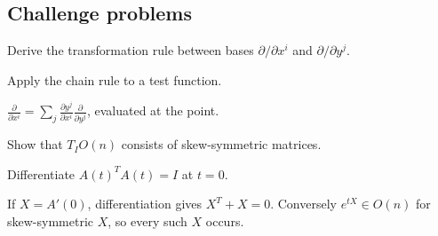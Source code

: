 \subsection*{Challenge problems}

\begin{exercise}\label{exr:vii04-ped-15}
Derive the transformation rule between bases \(\partial/\partial x^i\) and \(\partial/\partial y^j\).
\end{exercise}
\begin{hint}
Apply the chain rule to a test function.
\end{hint}
\begin{solution}
\(\frac{\partial}{\partial x^i}=\sum_j\frac{\partial y^j}{\partial x^i}\frac{\partial}{\partial y^j}\), evaluated at the point.
\end{solution}

\begin{exercise}\label{exr:vii04-ped-16}
Show that \(T_I O(n)\) consists of skew-symmetric matrices.
\end{exercise}
\begin{hint}
Differentiate \(A(t)^TA(t)=I\) at \(t=0\).
\end{hint}
\begin{solution}
If \(X=A'(0)\), differentiation gives \(X^T+X=0\).  Conversely \(e^{tX}\in O(n)\) for skew-symmetric \(X\), so every such \(X\) occurs.
\end{solution}

